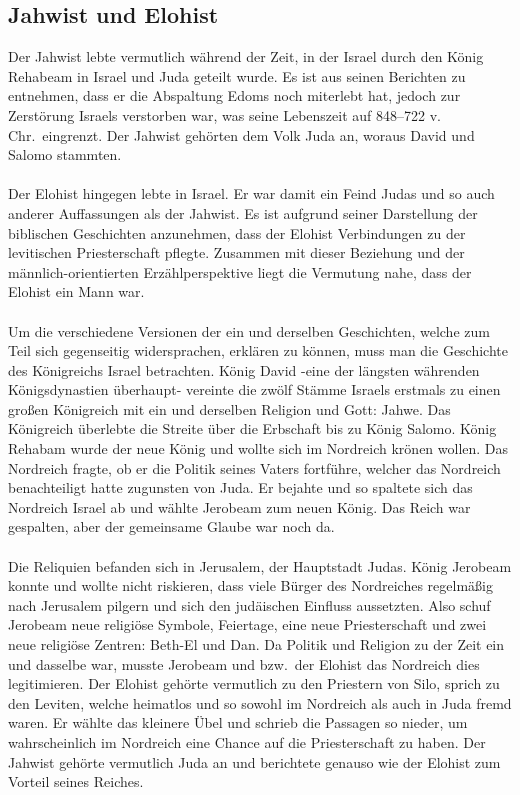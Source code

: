 \subsection*{Jahwist und Elohist}
Der Jahwist lebte vermutlich während der Zeit, in der Israel durch den König Rehabeam in Israel und Juda geteilt wurde. Es ist aus seinen Berichten zu entnehmen, dass er die Abspaltung Edoms noch miterlebt hat, jedoch zur Zerstörung Israels verstorben war, was seine Lebenszeit auf 848--722 v. Chr.\ eingrenzt. Der Jahwist gehörten dem Volk Juda an, woraus David und Salomo stammten.
\\~\\
Der Elohist hingegen lebte in Israel. Er war damit ein Feind Judas und so auch anderer Auffassungen als der Jahwist. Es ist aufgrund seiner Darstellung der biblischen Geschichten anzunehmen, dass der Elohist Verbindungen zu der levitischen Priesterschaft pflegte. Zusammen mit dieser Beziehung und der männlich-orientierten Erzählperspektive liegt die Vermutung nahe, dass der Elohist ein Mann war.
\\~\\
Um die verschiedene Versionen der ein und derselben Geschichten, welche zum Teil sich gegenseitig widersprachen, erklären zu können, muss man die Geschichte des Königreichs Israel betrachten. König David -eine der längsten währenden Königsdynastien überhaupt- vereinte die zwölf Stämme Israels erstmals zu einen großen Königreich mit ein und derselben Religion und Gott: Jahwe. Das Königreich überlebte die Streite über die Erbschaft bis zu König Salomo. König Rehabam wurde der neue König und wollte sich im Nordreich krönen wollen. Das Nordreich fragte, ob er die Politik seines Vaters fortführe, welcher das Nordreich benachteiligt hatte zugunsten von Juda. Er bejahte und so spaltete sich das Nordreich Israel ab und wählte Jerobeam zum neuen König. Das Reich war gespalten, aber der gemeinsame Glaube war noch da.
\\~\\
Die Reliquien befanden sich in Jerusalem, der Hauptstadt Judas. König Jerobeam konnte und wollte nicht riskieren, dass viele Bürger des Nordreiches regelmäßig nach Jerusalem pilgern und sich den judäischen Einfluss aussetzten. Also schuf Jerobeam neue religiöse Symbole, Feiertage, eine neue Priesterschaft und zwei neue religiöse Zentren: Beth-El und Dan. Da Politik und Religion zu der Zeit ein und dasselbe war, musste Jerobeam und bzw.\ der Elohist das Nordreich dies legitimieren. Der Elohist gehörte vermutlich zu den Priestern von Silo, sprich zu den Leviten, welche heimatlos und so sowohl im Nordreich als auch in Juda fremd waren. Er wählte das kleinere Übel und schrieb die Passagen so nieder, um wahrscheinlich im Nordreich eine Chance auf die Priesterschaft zu haben. Der Jahwist gehörte vermutlich Juda an und berichtete genauso wie der Elohist zum Vorteil seines Reiches.
